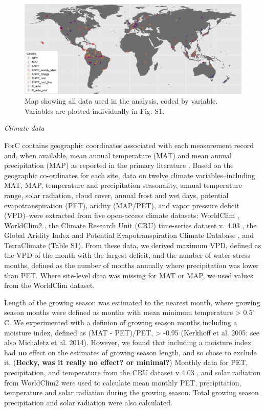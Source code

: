\documentclass[]{article}
\begin{document}
\begin{figure}[H]
\includegraphics[width=1\linewidth]{distribution_all_variables_cropped} \caption{Map showing all data used in the analysis, coded by variable. Variables are plotted individually in Fig. S1. }\label{fig:unnamed-chunk-6}
\end{figure}

\emph{Climate data}

ForC contains geographic coordinates associated with each measurement
record and, when available, mean annual temperature (MAT) and mean
annual precipitation (MAP) as reported in the primary literature
\citep{anderson-teixeira_forc_2018}. Based on the geographic
co-ordinates for each site, data on twelve climate variables--including
MAT, MAP, temperature and precipitation seasonality, annual temperature
range, solar radiation, cloud cover, annual frost and wet days,
potential evapotranspiration (PET), aridity (MAP/PET), and vapor
pressure deficit (VPD)--were extracted from five open-access climate
datasets: WorldClim \citep{hijmans_very_2005}, WorldClim2
\citep{fick_worldclim_2017}, the Climate Research Unit (CRU) time-series
dataset v. 4.03 \citep{harris_updated_2014}, the Global Aridity Index
and Potential Evapotranspiration Climate Database
\citep{trabucco_global_2019}, and TerraClimate
\citep{abatzoglou_terraclimate_2018} (Table S1). From these data, we
derived maximum VPD, defined as the VPD of the month with the largest
deficit, and the number of water stress months, defined as the number of
months annually where precipitation was lower than PET. Where site-level
data was missing for MAT or MAP, we used values from the WorldClim
dataset.

Length of the growing season was estimated to the nearest month, where
growing season months were defined as months with mean minimum
temperature \textgreater{} 0.5\(^\circ\)C. We experimented with a
definion of growing season months including a moisture index, defined as
(MAT - PET)/PET, \textgreater{} -0.95 (Kerkhoff et al. 2005; see also
Michaletz et al. 2014). However, we found that including a moisture
index had \textbf{no} effect on the estimates of growing season length,
and so chose to exclude it. (\textbf{Becky, was it really no effect? or
minimal?}) Monthly data for PET, precipitation, and temperature from the
CRU dataset v 4.03 \citep{harris_updated_2014}, and solar radiation from
WorldClim2 \citep{fick_worldclim_2017} were used to calculate mean
monthly PET, precipitation, temperature and solar radiation during the
growing season. Total growing season precipitation and solar radiation
were also calculated.
\end{document}
